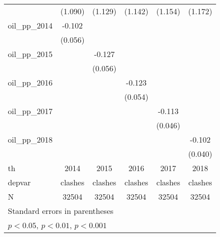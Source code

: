 {\begin{tabular}{l*{5}{c}}
            &     (1.090)         &     (1.129)         &     (1.142)         &     (1.154)         &     (1.172)         \\
[1em]
oil\_pp\_2014 &      -0.102         &                     &                     &                     &                     \\
            &     (0.056)         &                     &                     &                     &                     \\
[1em]
oil\_pp\_2015 &                     &      -0.127\sym{*}  &                     &                     &                     \\
            &                     &     (0.056)         &                     &                     &                     \\
[1em]
oil\_pp\_2016 &                     &                     &      -0.123\sym{*}  &                     &                     \\
            &                     &                     &     (0.054)         &                     &                     \\
[1em]
oil\_pp\_2017 &                     &                     &                     &      -0.113\sym{*}  &                     \\
            &                     &                     &                     &     (0.046)         &                     \\
[1em]
oil\_pp\_2018 &                     &                     &                     &                     &      -0.102\sym{*}  \\
            &                     &                     &                     &                     &     (0.040)         \\
\hline
th          &        2014         &        2015         &        2016         &        2017         &        2018         \\
depvar      &     clashes         &     clashes         &     clashes         &     clashes         &     clashes         \\
N           &       32504         &       32504         &       32504         &       32504         &       32504         \\
\hline\hline
\multicolumn{6}{l}{\footnotesize Standard errors in parentheses}\\
\multicolumn{6}{l}{\footnotesize \sym{*} \(p<0.05\), \sym{**} \(p<0.01\), \sym{***} \(p<0.001\)}\\
\end{tabular}
}
